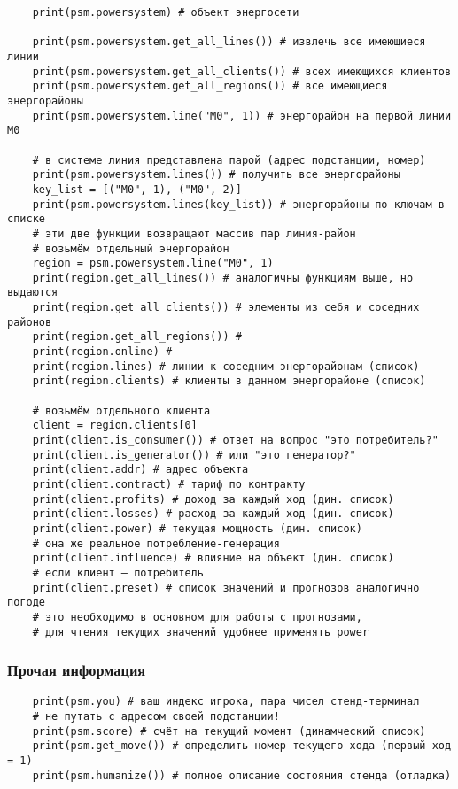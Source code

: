 \begin{verbatim}
    print(psm.powersystem) # объект энергосети 

    print(psm.powersystem.get_all_lines()) # извлечь все имеющиеся линии 
    print(psm.powersystem.get_all_clients()) # всех имеющихся клиентов 
    print(psm.powersystem.get_all_regions()) # все имеющиеся энергорайоны 
    print(psm.powersystem.line("M0", 1)) # энергорайон на первой линии M0 

    # в системе линия представлена парой (адрес_подстанции, номер) 
    print(psm.powersystem.lines()) # получить все энергорайоны 
    key_list = [("M0", 1), ("M0", 2)] 
    print(psm.powersystem.lines(key_list)) # энергорайоны по ключам в списке 
    # эти две функции возвращают массив пар линия-район 
    # возьмём отдельный энергорайон 
    region = psm.powersystem.line("M0", 1) 
    print(region.get_all_lines()) # аналогичны функциям выше, но выдаются 
    print(region.get_all_clients()) # элементы из себя и соседних районов 
    print(region.get_all_regions()) # 
    print(region.online) # 
    print(region.lines) # линии к соседним энергорайонам (список) 
    print(region.clients) # клиенты в данном энергорайоне (список) 

    # возьмём отдельного клиента 
    client = region.clients[0] 
    print(client.is_consumer()) # ответ на вопрос "это потребитель?" 
    print(client.is_generator()) # или "это генератор?" 
    print(client.addr) # адрес объекта 
    print(client.contract) # тариф по контракту 
    print(client.profits) # доход за каждый ход (дин. список) 
    print(client.losses) # расход за каждый ход (дин. список) 
    print(client.power) # текущая мощность (дин. список) 
    # она же реальное потребление-генерация 
    print(client.influence) # влияние на объект (дин. список) 
    # если клиент — потребитель 
    print(client.preset) # список значений и прогнозов аналогично погоде 
    # это необходимо в основном для работы с прогнозами, 
    # для чтения текущих значений удобнее применять power 
\end{verbatim}

\subsubsection*{Прочая информация}

\begin{verbatim}
    print(psm.you) # ваш индекс игрока, пара чисел стенд-терминал 
    # не путать с адресом своей подстанции! 
    print(psm.score) # счёт на текущий момент (динамческий список) 
    print(psm.get_move()) # определить номер текущего хода (первый ход = 1) 
    print(psm.humanize()) # полное описание состояния стенда (отладка) 
\end{verbatim}

